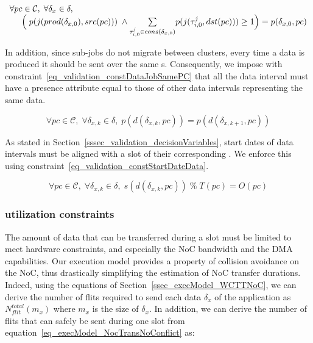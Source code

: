 \documentclass[main.tex]{subfiles}
\begin{document}
\begin{equation}
    \label{eq_validation_constDataPCmapping}
    \begin{array}{l}
        \forall pc \in \mathcal{C}, \; \forall \delta_{x} \in \delta,  \\
        \hspace{5mm} \Big( \; p(j(prod(\delta_{x,0}), src(pc))) \; \land \underset{\tau_{i,0}^j \in cons(\delta_{x,0})}{\sum} p(j(\tau_{i,0}^j , dst(pc))) \geq 1   \Big)  = p( \delta_{x,0} , pc  ) 
    \end{array}
\end{equation}

In addition, since sub-jobs do not migrate between clusters, every time a data is produced it should be sent over the same \PC{}s. Consequently, we impose with constraint~\ref{eq_validation_constDataJobSamePC} that all the data interval must have a presence attribute equal to those of other data intervals representing the same data.

\begin{equation}
    \label{eq_validation_constDataJobSamePC}
    \forall pc \in \mathcal{C}, \; \forall \delta_{x,k} \in \delta, \; 
    p( d( \delta_{x,k} , pc ) ) = p( d( \delta_{x,k+1} , pc ) )
\end{equation}

As stated in Section~\ref{sssec_validation_decisionVariables}, start dates of data intervals must be aligned with a slot of their corresponding \PC{}. We enforce this using constraint~\ref{eq_validation_constStartDateData}.

\begin{equation}
    \label{eq_validation_constStartDateData}
    \forall pc \in \mathcal{C}, \; \forall \delta_{x,k} \in \delta, \; 
    s( d( \delta_{x,k}, pc ) ) \; \% \; T(pc) = O(pc)
\end{equation}

\subsubsection{\PC{} utilization constraints}
\label{sssec_validation_PCutilConst}
The amount of data that can be transferred during a \PC{} slot must be limited to meet hardware constraints, and especially the NoC bandwidth and the DMA capabilities. Our execution model provides a property of collision avoidance on the NoC, thus drastically simplifying the estimation of NoC transfer durations. Indeed, using the equations of Section~\ref{ssec_execModel_WCTTNoC}, we can derive the number of flits required to send each data $\delta_x$ of the application as $N_{flit}^{total} ( m_x )$ where $m_x$ is the size of $\delta_x$. In addition, we can derive the number of flits that can safely be sent during one \PC{} slot from equation~\ref{eq_execModel_NocTransNoConflict} as:
\end{document}
